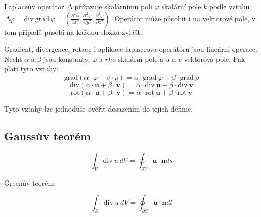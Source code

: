 \documentclass{book}
\newcommand{\vect}[1]{\boldsymbol{#1}}
\newcommand{\grad}{\mathrm{grad}}
\newcommand{\diverg}{\mathrm{div}}
\newcommand{\rot}{\mathrm{rot}}
\begin{document}
Laplaceův operátor \(\Delta\) přiřazuje skalárnímu poli \(\varphi\) skalární pole \(k\) podle vztahu \(\Delta \varphi = \diverg \ \grad \ \varphi = \left(\frac{\partial^2 \varphi}{\partial x^2}, \frac{\partial^2 \varphi}{\partial y^2}, \frac{\partial^2 \varphi}{\partial z^2}\right)\). Operátor může působit i na vektorové pole, v tom případě působí na každou složku zvlášť.


Gradient, divergence, rotace i aplikace laplaceova operátoru jsou lineární operace. Nechť \(\alpha\) a \(\beta\) jsou konstanty, \(\varphi\) a \(rho\) skalární pole a \(u\) a \(v\) vektorová pole. Pak platí tyto vztahy:
\[
\grad(\alpha \cdot \varphi + \beta \cdot \rho) = \alpha \cdot \grad \ \varphi + \beta \cdot \grad \ \rho
\]
\[
\diverg(\alpha \cdot \vect{u} + \beta \cdot \vect{v}) = \alpha \cdot \diverg \ \vect{u} + \beta \cdot \diverg \ \vect{v}
\]
\[
\rot(\alpha \cdot \vect{u} + \beta \cdot \vect{v}) = \alpha \cdot \rot \ \vect{u} + \beta \cdot \rot \ \vect{v}
\]

Tyto vztahy lze jednoduše ověřit dosazením do jejich definic.



\subsection{Gaussův teorém}

\begin{equation}
\int_V \diverg \ u \ dV = \oint_{\partial V} \vect{u} \cdot \vect{n} ds
\end{equation}


Greenův teorém:

\begin{equation}
\int_S \diverg \ u \ dV = \oint_{\partial S} \vect{u} \cdot \vect{n} dl
\end{equation}
\end{document}

